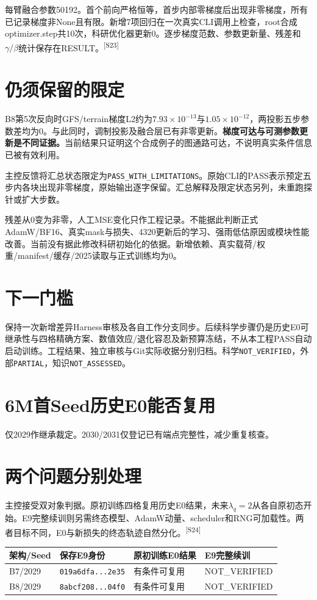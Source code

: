 \documentclass[UTF8,10.5pt,a4paper,fontset=none]{ctexart}
\newcommand{\evi}[1]{\textsuperscript{\color{muted}[#1]}}
\newcommand{\pageheading}[2]{\clearpage\section*{#1}\textcolor{muted}{#2}\par\vspace{3pt}}
\begin{document}
每臂融合参数50192。首个前向严格恒等，首步内部零梯度后出现非零梯度，所有已记录梯度非None且有限。新增7项回归在一次真实CLI调用上检查，root合成optimizer.step共10次，科研优化器更新0。逐步梯度范数、参数更新量、残差和$\gamma/\beta$统计保存在RESULT。\evi{S23}

\section*{仍须保留的限定}
B8第5次反向时GFS/terrain梯度L2约为$7.93\times10^{-13}$与$1.05\times10^{-12}$，两投影五步参数差均为0。与此同时，调制投影及融合层已有非零更新。\textbf{梯度可达与可测参数更新是不同证据。}当前结果只证明这个合成例子的图通路可达，不说明真实条件信息已被有效利用。

主控反馈将汇总状态限定为\texttt{PASS\_WITH\_LIMITATIONS}。原始CLI的PASS表示预定五步内各块出现非零梯度，原始输出逐字保留。汇总解释及限定状态另列，未重跑探针或扩大步数。

残差从0变为非零，人工MSE变化只作工程记录。不能据此判断正式AdamW/BF16、真实mask与损失、4320更新后的学习、强雨低估原因或模块性能改善。当前没有据此修改科研初始化的依据。新增依赖、真实载荷/权重/manifest/缓存/2025读取与正式训练均为0。

\section*{下一门槛}
保持一次新增差异Harness审核及各自工作分支同步。后续科学步骤仍是历史E0可继承性与四格精确方案、数值效应/退化容忍及新预算冻结，不从本工程PASS自动启动训练。工程结果、独立审核与Git实际收据分别归档。科学\texttt{NOT\_VERIFIED}，外部\texttt{PARTIAL}，知识\texttt{NOT\_ASSESSED}。

\pageheading{6M\quad 首Seed历史E0能否复用}{仅2029作继承裁定。2030/2031仅登记已有端点完整性，减少重复核查。}
\section*{两个问题分别处理}
主控接受双对象判据。原初训练四格复用历史E0结果，未来$\lambda_q=2$从各自原初态开始。E9完整续训则另需终态模型、AdamW动量、scheduler和RNG可加载性。两者目标不同，E0与新损失的终态轨迹自然分化。\evi{S24}

\begin{tabularx}{\textwidth}{@{}p{1.7cm}p{3.0cm}X X@{}}
\toprule 架构/Seed & 保存E9身份 & 原初训练E0结果 & E9完整续训\\\midrule
B7/2029 & \texttt{019a6dfa...2e35} & 有条件可复用 & NOT\_VERIFIED\\
B8/2029 & \texttt{8abcf208...04f0} & 有条件可复用 & NOT\_VERIFIED\\
\bottomrule
\end{tabularx}
\end{document}
